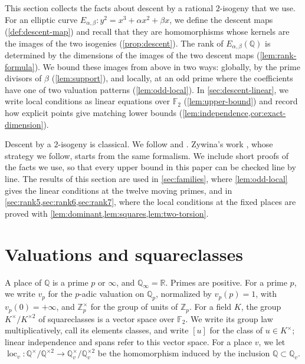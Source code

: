 \documentclass[12pt,oneside,openany]{book}
\theoremstyle{definition}
\theoremstyle{plain}
\numberwithin{equation}{chapter}
\theoremstyle{plain}
\theoremstyle{definition}
\theoremstyle{remark}
\newcommand{\Q}{\mathbb Q}
\newcommand{\Z}{\mathbb Z}
\newcommand{\F}{\mathbb F}
\newcommand{\R}{\mathbb R}
\newcommand{\sq}[1]{[#1]}
\newcommand{\sqgp}[1]{#1^{\times}/#1^{\times2}}
\begin{document}
This section collects the facts about descent by a rational $2$-isogeny that we use. For an elliptic curve $E_{\alpha,\beta}\colon y^2=x^3+\alpha x^2+\beta x$, we define the descent maps (\cref{def:descent-map}) and recall that they are homomorphisms whose kernels are the images of the two isogenies (\cref{prop:descent}). The rank of $E_{\alpha,\beta}(\Q)$ is determined by the dimensions of the images of the two descent maps (\cref{lem:rank-formula}). We bound these images from above in two ways: globally, by the prime divisors of $\beta$ (\cref{lem:support}), and locally, at an odd prime where the coefficients have one of two valuation patterns (\cref{lem:odd-local}). In \cref{sec:descent-linear}, we write local conditions as linear equations over $\F_2$ (\cref{lem:upper-bound}) and record how explicit points give matching lower bounds (\cref{lem:independence,cor:exact-dimension}).

Descent by a $2$-isogeny is classical. We follow \cite[Example~X.4.8 and Proposition~X.4.9]{SilvermanAEC} and \cite[Sections~3.4--3.6]{SilvermanTate2015}. Zywina's work \cite[Section~3]{Zywina2026}, whose strategy we follow, starts from the same formalism. We include short proofs of the facts we use, so that every upper bound in this paper can be checked line by line. The results of this section are used in \cref{sec:families}, where \cref{lem:odd-local} gives the linear conditions at the twelve moving primes, and in \cref{sec:rank5,sec:rank6,sec:rank7}, where the local conditions at the fixed places are proved with \cref{lem:dominant,lem:squares,lem:two-torsion}.

\section{Valuations and squareclasses}\label{sec:descent-conventions}

A place of $\Q$ is a prime $p$ or $\infty$, and $\Q_\infty=\R$. Primes are positive. For a prime $p$, we write $v_p$ for the $p$-adic valuation on $\Q_p$, normalized by $v_p(p)=1$, with $v_p(0)=+\infty$, and $\Z_p^\times$ for the group of units of $\Z_p$. For a field $K$, the group $\sqgp K$ of squareclasses is a vector space over $\F_2$. We write its group law multiplicatively, call its elements classes, and write $\sq u$ for the class of $u\in K^\times$; linear independence and spans refer to this vector space. For a place $v$, we let $\operatorname{loc}_v\colon\sqgp\Q\to\sqgp{\Q_v}$ be the homomorphism induced by the inclusion $\Q\subset\Q_v$.
\end{document}
